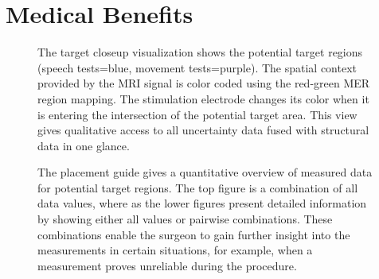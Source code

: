 \documentclass{egpubl}
\begin{document}
\section{Medical Benefits}\label{sec:benefits}
\begin{figure}[t]
  \centering
  \caption{The target closeup visualization shows the potential target regions (speech tests=blue, movement tests=purple). The spatial context provided by the MRI signal is color coded using the red-green MER region mapping. The stimulation electrode changes its color when it is entering the intersection of the potential target area. This view gives qualitative access to all uncertainty data fused with structural data in one glance.}
  \label{fig:targetregion}
\end{figure}

\begin{figure}[t]
  \centering
  \caption{The placement guide gives a quantitative overview of measured data for potential target regions. The top figure is a combination of all data values, where as the lower figures present detailed information by showing either all values or pairwise combinations. These combinations enable the surgeon to gain further insight into the measurements in certain situations, for example, when a measurement proves unreliable during the procedure.}
  \label{fig:placementguide}
\end{figure}
\end{document}
